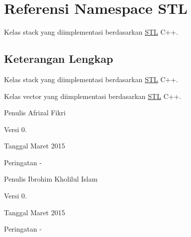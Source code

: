 \hypertarget{namespaceSTL}{}\section{Referensi Namespace S\+T\+L}
\label{namespaceSTL}


Kelas stack yang diimplementasi berdasarkan \hyperlink{namespaceSTL}{S\+T\+L} C++.  




\subsection{Keterangan Lengkap}
Kelas stack yang diimplementasi berdasarkan \hyperlink{namespaceSTL}{S\+T\+L} C++. 

Kelas vector yang diimplementasi berdasarkan \hyperlink{namespaceSTL}{S\+T\+L} C++.

\begin{DoxyAuthor}{Penulis}
Afrizal Fikri 
\end{DoxyAuthor}
\begin{DoxyVersion}{Versi}
0. 
\end{DoxyVersion}
\begin{DoxyDate}{Tanggal}
Maret 2015 
\end{DoxyDate}
\begin{DoxyWarning}{Peringatan}
-\/
\end{DoxyWarning}
\begin{DoxyAuthor}{Penulis}
Ibrohim Kholilul Islam 
\end{DoxyAuthor}
\begin{DoxyVersion}{Versi}
0. 
\end{DoxyVersion}
\begin{DoxyDate}{Tanggal}
Maret 2015 
\end{DoxyDate}
\begin{DoxyWarning}{Peringatan}
-\/ 
\end{DoxyWarning}
